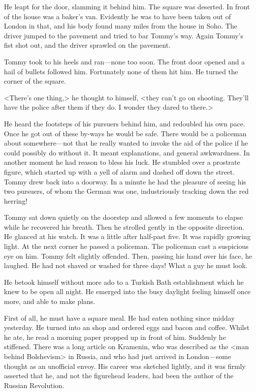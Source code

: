 He leapt for the door, slamming it behind him. The square was deserted. In front of the house was a baker's van. Evidently he was to have been taken out of London in that, and his body found many miles from the house in Soho. The driver jumped to the pavement and tried to bar Tommy's way. Again Tommy's fist shot out, and the driver sprawled on the pavement.

Tommy took to his heels and ran—none too soon. The front door opened and a hail of bullets followed him. Fortunately none of them hit him. He turned the corner of the square.

<There's one thing,> he thought to himself, <they can't go on shooting. They'll have the police after them if they do. I wonder they dared to there.>

He heard the footsteps of his pursuers behind him, and redoubled his own pace. Once he got out of these by-ways he would be safe. There would be a policeman about somewhere—not that he really wanted to invoke the aid of the police if he could possibly do without it. It meant explanations, and general awkwardness. In another moment he had reason to bless his luck. He stumbled over a prostrate figure, which started up with a yell of alarm and dashed off down the street. Tommy drew back into a doorway. In a minute he had the pleasure of seeing his two pursuers, of whom the German was one, industriously tracking down the red herring!

Tommy sat down quietly on the doorstep and allowed a few moments to elapse while he recovered his breath. Then he strolled gently in the opposite direction. He glanced at his watch. It was a little after half-past five. It was rapidly growing light. At the next corner he passed a policeman. The policeman cast a suspicious eye on him. Tommy felt slightly offended. Then, passing his hand over his face, he laughed. He had not shaved or washed for three days! What a guy he must look.

He betook himself without more ado to a Turkish Bath establishment which he knew to be open all night. He emerged into the busy daylight feeling himself once more, and able to make plans.

First of all, he must have a square meal. He had eaten nothing since midday yesterday. He turned into an  shop and ordered eggs and bacon and coffee. Whilst he ate, he read a morning paper propped up in front of him. Suddenly he stiffened. There was a long article on Kramenin, who was described as the <man behind Bolshevism> in Russia, and who had just arrived in London—some thought as an unofficial envoy. His career was sketched lightly, and it was firmly asserted that he, and not the figurehead leaders, had been the author of the Russian Revolution.

